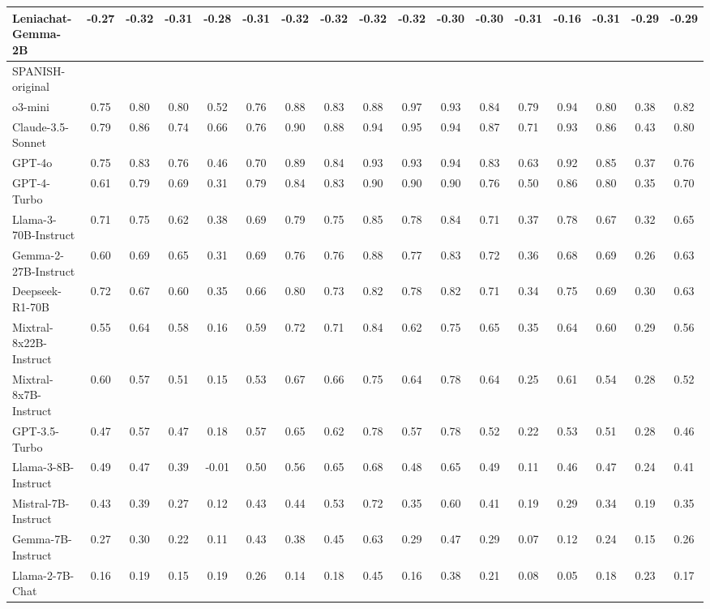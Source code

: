 \begin{table*}[ht]
{\begin{tabular}{lcccccccccccccccc}
Leniachat-Gemma-2B & -0.27 & -0.32 & -0.31 & -0.28 & -0.31 & -0.32 & -0.32 & -0.32 & -0.32 & -0.30 & -0.30 & -0.31 & -0.16 & -0.31 & -0.29 & -0.29 \\
\midrule
SPANISH-original  &&&&&&&&&&&&\\
\midrule
o3-mini & 0.75 & 0.80 & 0.80 & 0.52 & 0.76 & 0.88 & 0.83 & 0.88 & 0.97 & 0.93 & 0.84 & 0.79 & 0.94 & 0.80 & 0.38 & 0.82 \\
Claude-3.5-Sonnet & 0.79 & 0.86 & 0.74 & 0.66 & 0.76 & 0.90 & 0.88 & 0.94 & 0.95 & 0.94 & 0.87 & 0.71 & 0.93 & 0.86 & 0.43 & 0.80 \\
GPT-4o & 0.75 & 0.83 & 0.76 & 0.46 & 0.70 & 0.89 & 0.84 & 0.93 & 0.93 & 0.94 & 0.83 & 0.63 & 0.92 & 0.85 & 0.37 & 0.76 \\
GPT-4-Turbo & 0.61 & 0.79 & 0.69 & 0.31 & 0.79 & 0.84 & 0.83 & 0.90 & 0.90 & 0.90 & 0.76 & 0.50 & 0.86 & 0.80 & 0.35 & 0.70 \\
Llama-3-70B-Instruct & 0.71 & 0.75 & 0.62 & 0.38 & 0.69 & 0.79 & 0.75 & 0.85 & 0.78 & 0.84 & 0.71 & 0.37 & 0.78 & 0.67 & 0.32 & 0.65 \\
Gemma-2-27B-Instruct & 0.60 & 0.69 & 0.65 & 0.31 & 0.69 & 0.76 & 0.76 & 0.88 & 0.77 & 0.83 & 0.72 & 0.36 & 0.68 & 0.69 & 0.26 & 0.63 \\
Deepseek-R1-70B & 0.72 & 0.67 & 0.60 & 0.35 & 0.66 & 0.80 & 0.73 & 0.82 & 0.78 & 0.82 & 0.71 & 0.34 & 0.75 & 0.69 & 0.30 & 0.63 \\
Mixtral-8x22B-Instruct & 0.55 & 0.64 & 0.58 & 0.16 & 0.59 & 0.72 & 0.71 & 0.84 & 0.62 & 0.75 & 0.65 & 0.35 & 0.64 & 0.60 & 0.29 & 0.56 \\
Mixtral-8x7B-Instruct & 0.60 & 0.57 & 0.51 & 0.15 & 0.53 & 0.67 & 0.66 & 0.75 & 0.64 & 0.78 & 0.64 & 0.25 & 0.61 & 0.54 & 0.28 & 0.52 \\
GPT-3.5-Turbo & 0.47 & 0.57 & 0.47 & 0.18 & 0.57 & 0.65 & 0.62 & 0.78 & 0.57 & 0.78 & 0.52 & 0.22 & 0.53 & 0.51 & 0.28 & 0.46 \\
Llama-3-8B-Instruct & 0.49 & 0.47 & 0.39 & -0.01 & 0.50 & 0.56 & 0.65 & 0.68 & 0.48 & 0.65 & 0.49 & 0.11 & 0.46 & 0.47 & 0.24 & 0.41 \\
Mistral-7B-Instruct & 0.43 & 0.39 & 0.27 & 0.12 & 0.43 & 0.44 & 0.53 & 0.72 & 0.35 & 0.60 & 0.41 & 0.19 & 0.29 & 0.34 & 0.19 & 0.35 \\
Gemma-7B-Instruct & 0.27 & 0.30 & 0.22 & 0.11 & 0.43 & 0.38 & 0.45 & 0.63 & 0.29 & 0.47 & 0.29 & 0.07 & 0.12 & 0.24 & 0.15 & 0.26 \\
Llama-2-7B-Chat & 0.16 & 0.19 & 0.15 & 0.19 & 0.26 & 0.14 & 0.18 & 0.45 & 0.16 & 0.38 & 0.21 & 0.08 & 0.05 & 0.18 & 0.23 & 0.17 \\

\end{tabular}}
\end{table*}
